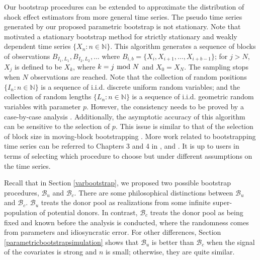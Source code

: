 \documentclass[11pt]{article}
\def\mc#1{\mathcal{#1}} %
\theoremstyle{definition}
\begin{document}
Our bootstrap procedures can be extended to approximate the distribution of shock effect estimators from more general time series. The pseudo time series generated by our proposed parametric bootstrap is not stationary. Note that \citet{politis1994stationary} motivated a stationary bootstrap method for strictly stationary and weakly dependent time series $\{X_n \colon n \in \mathbb{N}\}$. This algorithm generates a sequence of blocks of observations $B_{I_1, L_1}, B_{I_2, L_2}, \ldots$ where $B_{i,b}= \{X_i, X_{i+1}, \ldots, X_{i+b-1}\}$; for $j > N$, $X_{j}$ is defined to be $X_k$, where $k = j \hspace{-.1cm} \mod N$ and $X_0 = X_N$. The sampling stops when $N$ observations are reached. Note that the collection of random positions $\{I_n \colon n \in \mathbb{N}\}$ is a sequence of i.i.d. discrete uniform random variables; and the collection of random lengths $\{L_n \colon n \in \mathbb{N}\}$ is a sequence of  i.i.d. geometric random variables with parameter $p$.  However, the consistency needs to be proved by a case-by-case analysis \citep[Page 66]{politis1999subsampling}. Additionally, the asymptotic accuracy of this algorithm can be sensitive to the selection of $p$. This issue is similar to that of the selection of block size in moving-block bootstrapping \citep{kunsch1989jackknife, liu1992moving}.  More work related to bootstrapping time series  can be referred to Chapters 3 and 4 in \citet{politis1999subsampling}, and \citet{berkowitz2000recent}. It is up to  users in terms of selecting which procedure to choose but under different assumptions on the time series.



Recall that in Section \ref{varbootstrap}, we proposed two possible bootstrap procedures, $\mc{B}_u$  and $\mc{B}_c$. There are some philosophical distinctions between $\mc{B}_u$  and $\mc{B}_c$. $\mc{B}_u$ treats the donor pool as realizations from some infinite super-population of potential donors. In contrast, $\mc{B}_c$ treats the donor pool as being fixed  and known before the analysis is conducted, where the randomness comes from parameters and idiosyncratic error. For other differences,  Section \ref{parametricbootstrapsimulation} shows that $\mc{B}_u$ is better than $\mc{B}_c$ when the signal of the covariates is strong and $n$ is small; otherwise, they are quite similar.
\end{document}
